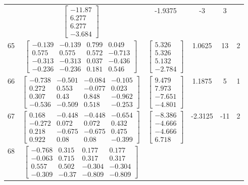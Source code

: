 \documentclass[a4paper,12pt]{article}
\begin{document}
\begin{tabular}{c c c c c c}
&
$\begin{bmatrix} -11.87 \\ 6.277 \\ 6.277 \\ -3.684 \end{bmatrix}$
&
-1.9375
&
-3
&
3
\\
65
&
$\begin{bmatrix} -0.139 & -0.139 & 0.799 & 0.049 \\ 0.575 & 0.575 & 0.572 & -0.713 \\ -0.313 & -0.313 & 0.037 & -0.436 \\ -0.236 & -0.236 & 0.181 & 0.546 \end{bmatrix}$
&
$\begin{bmatrix} 5.326 \\ 5.326 \\ 5.132 \\ -2.784 \end{bmatrix}$
&
1.0625
&
13
&
2
\\
66
&
$\begin{bmatrix} -0.738 & -0.501 & -0.084 & -0.105 \\ 0.272 & 0.553 & -0.077 & 0.023 \\ 0.307 & 0.43 & 0.848 & -0.962 \\ -0.536 & -0.509 & 0.518 & -0.253 \end{bmatrix}$
&
$\begin{bmatrix} 9.479 \\ 7.973 \\ -7.651 \\ -4.801 \end{bmatrix}$
&
1.1875
&
5
&
1
\\
67
&
$\begin{bmatrix} 0.168 & -0.448 & -0.448 & -0.654 \\ -0.272 & 0.072 & 0.072 & 0.432 \\ 0.218 & -0.675 & -0.675 & 0.475 \\ 0.922 & 0.08 & 0.08 & -0.399 \end{bmatrix}$
&
$\begin{bmatrix} -8.386 \\ -4.666 \\ -4.666 \\ 6.718 \end{bmatrix}$
&
-2.3125
&
-11
&
2
\\
68
&
$\begin{bmatrix} -0.768 & 0.315 & 0.177 & 0.177 \\ -0.063 & 0.715 & 0.317 & 0.317 \\ 0.557 & 0.502 & -0.304 & -0.304 \\ -0.309 & -0.37 & -0.809 & -0.809 \end{bmatrix}$

\end{tabular}
\end{document}
